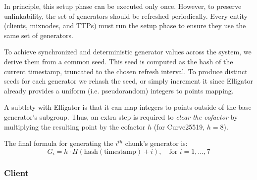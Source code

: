 In principle, this setup phase can be executed only once. 
However, to preserve unlinkability, the set of generators should be refreshed periodically. 
Every entity (clients, mixnodes, and TTPs) must run the setup phase to ensure they use the same set of generators.

To achieve synchronized and deterministic generator values across the system, we derive them from a common seed. 
This seed is computed as the hash of the current timestamp, truncated to the chosen refresh interval. 
To produce distinct seeds for each generator we rehash the seed, or simply increment it since Elligator already provides a uniform (i.e. pseudorandom) integers to points mapping.

A subtlety with Elligator is that it can map integers to points outside of the base generator's subgroup.
Thus, an extra step is required to \textit{clear the cofactor} by multiplying the resulting point by the cofactor $ h $ (for Curve25519, $ h = 8 $).

\noindent The final formula for generating the $ i^{th} $ chunk’s generator is:
$$
G_i = h \cdot H(\text{hash}(\text{timestamp}) + i), \quad \text{for } i = 1, \dots, 7
$$


\subsubsection{Client}
  
